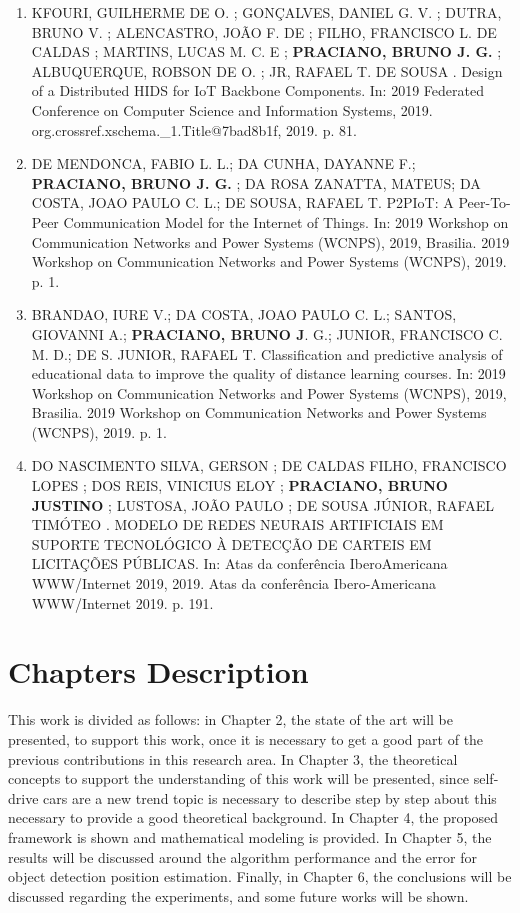 \begin{enumerate}
\item KFOURI, GUILHERME DE O. ; GONÇALVES, DANIEL G. V. ; DUTRA, BRUNO V. ; ALENCASTRO, JOÃO F. DE ; FILHO, FRANCISCO L. DE CALDAS ; MARTINS, LUCAS M. C. E ; \textbf{PRACIANO, BRUNO J. G.} ; ALBUQUERQUE, ROBSON DE O. ; JR, RAFAEL T. DE SOUSA . Design of a Distributed HIDS for IoT Backbone Components. In: 2019 Federated Conference on Computer Science and Information Systems, 2019. org.crossref.xschema.\_1.Title@7bad8b1f, 2019. p. 81.

\item DE MENDONCA, FABIO L. L.; DA CUNHA, DAYANNE F.; \textbf{PRACIANO, BRUNO J. G.} ; DA ROSA ZANATTA, MATEUS; DA COSTA, JOAO PAULO C. L.; DE SOUSA, RAFAEL T. P2PIoT: A Peer-To-Peer Communication Model for the Internet of Things. In: 2019 Workshop on Communication Networks and Power Systems (WCNPS), 2019, Brasilia. 2019 Workshop on Communication Networks and Power Systems (WCNPS), 2019. p. 1.

\item BRANDAO, IURE V.; DA COSTA, JOAO PAULO C. L.; SANTOS, GIOVANNI A.; \textbf{PRACIANO, BRUNO J}. G.; JUNIOR, FRANCISCO C. M. D.; DE S. JUNIOR, RAFAEL T. Classification and predictive analysis of educational data to improve the quality of distance learning courses. In: 2019 Workshop on Communication Networks and Power Systems (WCNPS), 2019, Brasilia. 2019 Workshop on Communication Networks and Power Systems (WCNPS), 2019. p. 1.


\item DO NASCIMENTO SILVA, GERSON ; DE CALDAS FILHO, FRANCISCO LOPES ; DOS REIS, VINICIUS ELOY ; \textbf{PRACIANO, BRUNO JUSTINO }; LUSTOSA, JOÃO PAULO ; DE SOUSA JÚNIOR, RAFAEL TIMÓTEO . MODELO DE REDES NEURAIS ARTIFICIAIS EM SUPORTE TECNOLÓGICO À DETECÇÃO DE CARTEIS EM LICITAÇÕES PÚBLICAS. In: Atas da conferência IberoAmericana WWW/Internet 2019, 2019. Atas da conferência Ibero-Americana WWW/Internet 2019. p. 191.

\end{enumerate}

\section{Chapters Description}

This work is divided as follows: in Chapter 2, the state of the art will be presented, to support this work, once it is necessary to get a good part of the previous contributions in this research area. In Chapter 3, the theoretical concepts to support the understanding of this work will be presented, since self-drive cars are a new trend topic is necessary to describe step by step about this necessary to provide a good theoretical background. In Chapter 4, the proposed framework is shown and mathematical modeling is provided. In Chapter 5, the results will be discussed around the algorithm performance and the error for object detection position estimation. Finally, in Chapter 6, the conclusions will be discussed regarding the experiments, and some future works will be shown.


